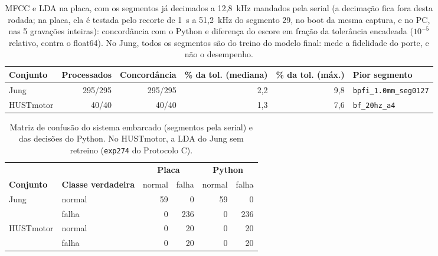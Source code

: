 \begin{table}[H]
\centering
\caption{MFCC e LDA na placa, com os segmentos já decimados a 12,8~kHz mandados pela serial (a decimação fica fora desta rodada; na placa, ela é testada pelo recorte de 1~s a 51,2~kHz do segmento 29, no boot da mesma captura, e no PC, nas 5 gravações inteiras): concordância com o Python e diferença do escore em fração da tolerância encadeada ($10^{-5}$ relativo, contra o float64). No Jung, todos os segmentos são do treino do modelo final: mede a fidelidade do porte, e não o desempenho.}
\label{tab:serial_placa_resumo}
\small
\begin{tabular}{lrrrrl}
\toprule
\textbf{Conjunto} & \textbf{Processados} & \textbf{Concordância} & \textbf{\% da tol. (mediana)} & \textbf{\% da tol. (máx.)} & \textbf{Pior segmento} \\
\midrule
Jung & 295/295 & 295/295 & 2,2 & 9,8 & \texttt{bpfi\_1.0mm\_seg0127} \\
HUSTmotor & 40/40 & 40/40 & 1,3 & 7,6 & \texttt{bf\_20hz\_a4} \\
\bottomrule
\end{tabular}
\end{table}

\begin{table}[H]
\centering
\caption{Matriz de confusão do sistema embarcado (segmentos pela serial) e das decisões do Python. No HUSTmotor, a LDA do Jung sem retreino (\texttt{exp274} do Protocolo C).}
\label{tab:serial_placa_matriz}
\small
\begin{tabular}{llrrrr}
\toprule
 & & \multicolumn{2}{c}{\textbf{Placa}} & \multicolumn{2}{c}{\textbf{Python}} \\
\cmidrule(lr){3-4}\cmidrule(lr){5-6}
\textbf{Conjunto} & \textbf{Classe verdadeira} & normal & falha & normal & falha \\
\midrule
Jung & normal & 59 & 0 & 59 & 0 \\
 & falha & 0 & 236 & 0 & 236 \\
\midrule
HUSTmotor & normal & 0 & 20 & 0 & 20 \\
 & falha & 0 & 20 & 0 & 20 \\
\bottomrule
\end{tabular}
\end{table}
